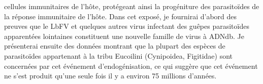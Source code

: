cellules immunitaires de l'hôte, protégeant ainsi la progéniture des parasitoïdes de la réponse immunitaire de l'hôte. Dans cet exposé, je fournirai d'abord des preuves que le LbFV et quelques autres virus infectant des guêpes parasitoïdes apparentées lointaines constituent une nouvelle famille de virus à ADNdb. Je présenterai ensuite des données montrant que la plupart des espèces de parasitoïdes appartenant à la tribu Eucoilini (Cynipoidea, Figitidae) sont concernées par cet événement d'endogénisation, ce qui suggère que cet événement ne s'est produit qu'une seule fois il y a environ 75 millions d'années. 

